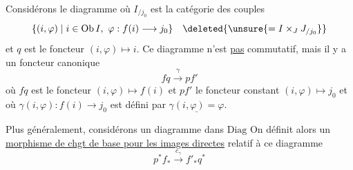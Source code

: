 Considérons le diagramme
où $I_{/j_0}$ est la catégorie  des couples
\[
\{(i,\varphi)\mid i\in\mathrm{Ob}\,I,\ \varphi:f(i)\longrightarrow j_0\}
\quad\deleted{\unsure{=I\times_J J_{/j_0}}}
\]
et $q$ est le foncteur $(i,\varphi)\longmapsto i$. Ce diagramme n'est \uline{pas} commutatif, mais il y a un foncteur canonique
\[
fq\xrightarrow{\gamma}pf'
\]
où $fq$ est le foncteur $(i,\varphi)\mapsto f(i)$ et $pf'$ le foncteur constant $(i,\varphi)\longmapsto j_0$ et où $\gamma(i,\varphi):f(i)\longrightarrow j_0$ est défini par $\underline{\gamma(i,\varphi)=\varphi}$.

Plus généralement, considérons un diagramme dans $\mathrm{Diag}$
On définit alors un \uline{morphisme de chgt de base pour les images directes} relatif à ce diagramme
\[
\boxed{p^*f_*\xrightarrow{c_\gamma}f'_*q^*}
\]
